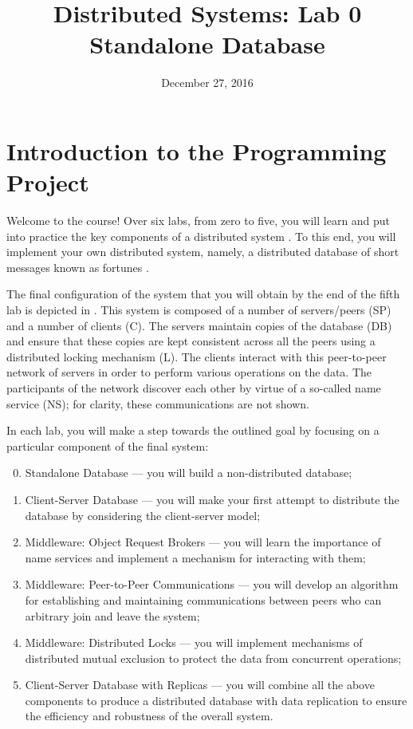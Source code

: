 \documentclass[a4paper,10pt]{article}
\title{%
  Distributed Systems: Lab 0\\%
  Standalone Database%
}
\author{}
\date{December 27, 2016}
\begin{document}
\maketitle

\section{Introduction to the Programming Project} 

Welcome to the course! Over six labs, from zero to five, you will learn and put
into practice the key components of a distributed system \cite{lecture1}. To
this end, you will implement your own distributed system, namely, a distributed
database of short messages known as fortunes \cite{fortune}.

The final configuration of the system that you will obtain by the end of the
fifth lab is depicted in . This system is composed of
a number of servers/peers (SP) and a number of clients (C). The servers maintain
copies of the database (DB) and ensure that these copies are kept consistent
across all the peers using a distributed locking mechanism (L). The clients
interact with this peer-to-peer network of servers in order to perform various
operations on the data. The participants of the network discover each other by
virtue of a so-called name service (NS); for clarity, these communications are
not shown.

In each lab, you will make a step towards the outlined goal by focusing on a
particular component of the final system:
\begin{enumerate}

  \setcounter{enumi}{-1}

  \item Standalone Database --- you will build a non-distributed database;

  \item Client-Server Database --- you will make your first attempt to
  distribute the database by considering the client-server model;

  \item Middleware: Object Request Brokers --- you will learn the importance of
  name services and implement a mechanism for interacting with them;

  \item Middleware: Peer-to-Peer Communications --- you will develop an
  algorithm for establishing and maintaining communications between peers who
  can arbitrary join and leave the system;

  \item Middleware: Distributed Locks --- you will implement mechanisms of
  distributed mutual exclusion to protect the data from concurrent operations;

  \item Client-Server Database with Replicas --- you will combine all the above
  components to produce a distributed database with data replication to ensure
  the efficiency and robustness of the overall system.

\end{enumerate}
\end{document}

